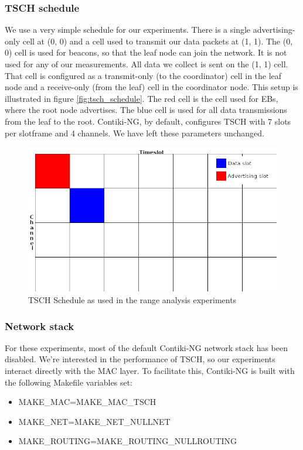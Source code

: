 \documentclass[conference]{IEEEtran}
\begin{document}
\subsubsection{TSCH schedule}
\label{section:tschschedule}

We use a very simple schedule for our experiments. There is a single advertising-only cell at (0, 0) and a cell used to transmit our data packets at (1, 1). The (0, 0) cell is used for beacons, so that the leaf node can join the network. It is not used for any of our measurements. All data we collect is sent on the (1, 1) cell. That cell is configured as a transmit-only (to the coordinator) cell in the leaf node and a receive-only (from the leaf) cell in the coordinator node. This setup is illustrated in figure \ref{fig:tsch_schedule}. The red cell is the cell used for EBs, where the root node advertises. The blue cell is used for all data transmissions from the leaf to the root. Contiki-NG, by default, configures TSCH with 7 slots per slotframe and 4 channels. We have left these parameters unchanged. 
\begin{figure}[]
	\centering
	\includegraphics[width=.4\textwidth,keepaspectratio]{tsch_schedule.png}
	\caption{TSCH Schedule as used in the range analysis experiments}
	\label{fig:TSCHSchedule}
\end{figure}


\subsubsection{Network stack}
\label{section:netstack}

For these experiments, most of the default Contiki-NG network stack has been disabled. We're interested in the performance of TSCH, so our experiments interact directly with the MAC layer. To facilitate this, Contiki-NG is built with the following Makefile variables set: 

\begin{itemize}
\item MAKE\_MAC=MAKE\_MAC\_TSCH
\item MAKE\_NET=MAKE\_NET\_NULLNET
\item MAKE\_ROUTING=MAKE\_ROUTING\_NULLROUTING
\end{itemize}
\end{document}

